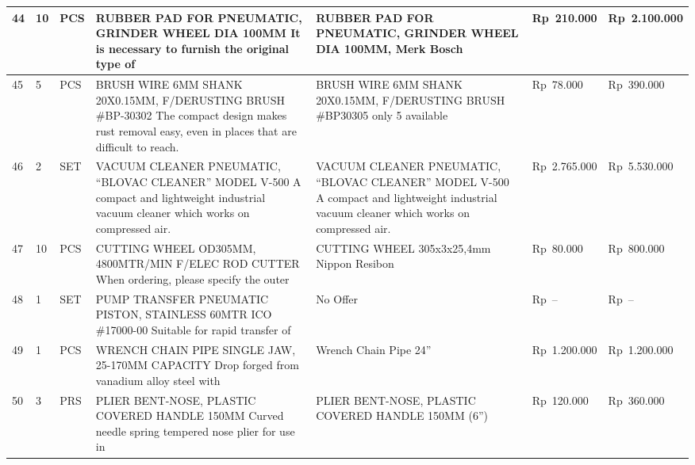 \documentclass[9pt,a4paper,landscape]{article}
\begin{document}
\begin{longtable}{|C{0.6cm}|C{0.6cm}|C{0.8cm}|L{8.0cm}|L{9.5cm}|R{2.5cm}|R{2.5cm}|}
44 & 10 & PCS &
  RUBBER PAD FOR PNEUMATIC, GRINDER WHEEL DIA\newline
  100MM It is necessary to furnish the original type of &
  RUBBER PAD FOR PNEUMATIC, GRINDER WHEEL DIA 100MM, Merk Bosch &
  Rp~210.000 & Rp~2.100.000 \\
\hline

45 & 5 & PCS &
  BRUSH WIRE 6MM SHANK 20X0.15MM, F/DERUSTING\newline
  BRUSH \#BP-30302 The compact design makes rust\newline
  removal easy, even in places that are difficult to reach. &
  BRUSH WIRE 6MM SHANK 20X0.15MM, F/DERUSTING BRUSH \#BP30305\newline
  only 5 available &
  Rp~78.000 & Rp~390.000 \\
\hline

46 & 2 & SET &
  VACUUM CLEANER PNEUMATIC, ``BLOVAC CLEANER''\newline
  MODEL V-500 A compact and lightweight industrial\newline
  vacuum cleaner which works on compressed air. &
  VACUUM CLEANER PNEUMATIC, ``BLOVAC CLEANER'' MODEL V-500\newline
  A compact and lightweight industrial vacuum cleaner which works on compressed air. &
  Rp~2.765.000 & Rp~5.530.000 \\
\hline

47 & 10 & PCS &
  CUTTING WHEEL OD305MM, 4800MTR/MIN F/ELEC\newline
  ROD CUTTER When ordering, please specify the outer &
  CUTTING WHEEL 305x3x25,4mm Nippon Resibon &
  Rp~80.000 & Rp~800.000 \\
\hline

48 & 1 & SET &
  PUMP TRANSFER PNEUMATIC PISTON, STAINLESS\newline
  60MTR ICO \#17000-00 Suitable for rapid transfer of &
  \textcolor[gray]{0.5}{No Offer} &
  \textcolor[gray]{0.5}{Rp~--} & \textcolor[gray]{0.5}{Rp~--} \\
\hline

49 & 1 & PCS &
  WRENCH CHAIN PIPE SINGLE JAW, 25-170MM\newline
  CAPACITY Drop forged from vanadium alloy steel with &
  Wrench Chain Pipe 24'' &
  Rp~1.200.000 & Rp~1.200.000 \\
\hline

50 & 3 & PRS &
  PLIER BENT-NOSE, PLASTIC COVERED HANDLE 150MM\newline
  Curved needle spring tempered nose plier for use in &
  PLIER BENT-NOSE, PLASTIC COVERED HANDLE 150MM (6'') &
  Rp~120.000 & Rp~360.000 \\
\hline


\end{longtable}
\end{document}
